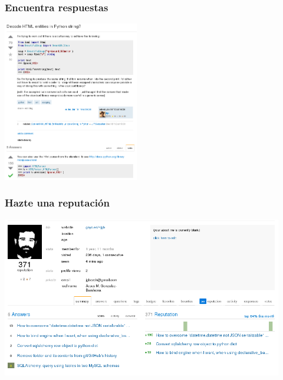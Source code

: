 \begin{frame}
\frametitle{Encuentra respuestas}

\begin{center}
\includegraphics[height=7cm]{figs/sof-question}
\end{center}

\end{frame}

\begin{frame}
\frametitle{Hazte una reputación}

\begin{center}
\includegraphics[height=7cm]{figs/sof-dashboard}
\end{center}

\end{frame}


